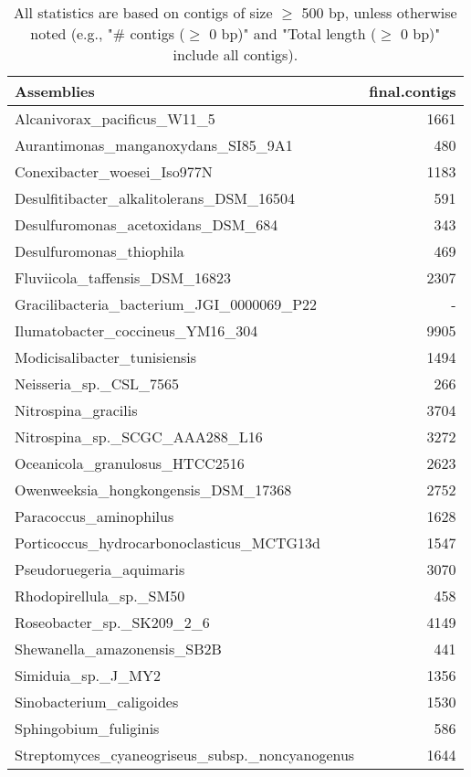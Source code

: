 \documentclass[12pt,a4paper]{article}
\begin{document}
\begin{table}[ht]
\begin{center}
\caption{All statistics are based on contigs of size $\geq$ 500 bp, unless otherwise noted (e.g., "\# contigs ($\geq$ 0 bp)" and "Total length ($\geq$ 0 bp)" include all contigs).}
\begin{tabular}{|l*{1}{|r}|}
\hline
Assemblies & final.contigs \\ \hline
Alcanivorax\_pacificus\_W11\_5 & 1661 \\ \hline
Aurantimonas\_manganoxydans\_SI85\_9A1 & 480 \\ \hline
Conexibacter\_woesei\_Iso977N & 1183 \\ \hline
Desulfitibacter\_alkalitolerans\_DSM\_16504 & 591 \\ \hline
Desulfuromonas\_acetoxidans\_DSM\_684 & 343 \\ \hline
Desulfuromonas\_thiophila & 469 \\ \hline
Fluviicola\_taffensis\_DSM\_16823 & 2307 \\ \hline
Gracilibacteria\_bacterium\_JGI\_0000069\_P22 & - \\ \hline
Ilumatobacter\_coccineus\_YM16\_304 & 9905 \\ \hline
Modicisalibacter\_tunisiensis & 1494 \\ \hline
Neisseria\_sp.\_CSL\_7565 & 266 \\ \hline
Nitrospina\_gracilis & 3704 \\ \hline
Nitrospina\_sp.\_SCGC\_AAA288\_L16 & 3272 \\ \hline
Oceanicola\_granulosus\_HTCC2516 & 2623 \\ \hline
Owenweeksia\_hongkongensis\_DSM\_17368 & 2752 \\ \hline
Paracoccus\_aminophilus & 1628 \\ \hline
Porticoccus\_hydrocarbonoclasticus\_MCTG13d & 1547 \\ \hline
Pseudoruegeria\_aquimaris & 3070 \\ \hline
Rhodopirellula\_sp.\_SM50 & 458 \\ \hline
Roseobacter\_sp.\_SK209\_2\_6 & 4149 \\ \hline
Shewanella\_amazonensis\_SB2B & 441 \\ \hline
Simiduia\_sp.\_J\_MY2 & 1356 \\ \hline
Sinobacterium\_caligoides & 1530 \\ \hline
Sphingobium\_fuliginis & 586 \\ \hline
Streptomyces\_cyaneogriseus\_subsp.\_noncyanogenus & 1644 \\ \hline

\end{tabular}
\end{center}
\end{table}
\end{document}

